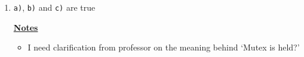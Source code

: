 \documentclass[12pt]{article}
\begin{document}
\begin{enumerate}[1.]
\begin{enumerate}[a)]
\begin{itemize}


        \end{itemize}


    \end{enumerate}

    \bigskip

    \item

    \texttt{a)}, \texttt{b)} and \texttt{c)} are true

    \bigskip

    \underline{\textbf{Notes}}

    \begin{itemize}
        \item I need clarification from professor on the meaning behind `Mutex is held?'
    \end{itemize}
\end{enumerate}
\end{document}
